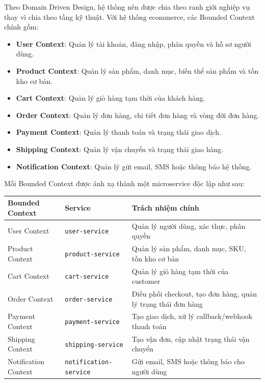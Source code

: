 Theo Domain Driven Design, hệ thống nên được chia theo ranh giới nghiệp vụ thay vì chia theo tầng kỹ thuật. Với hệ thống ecommerce, các Bounded Context chính gồm:

\begin{itemize}
  \item \textbf{User Context}: Quản lý tài khoản, đăng nhập, phân quyền và hồ sơ người dùng.
  \item \textbf{Product Context}: Quản lý sản phẩm, danh mục, biến thể sản phẩm và tồn kho cơ bản.
  \item \textbf{Cart Context}: Quản lý giỏ hàng tạm thời của khách hàng.
  \item \textbf{Order Context}: Quản lý đơn hàng, chi tiết đơn hàng và vòng đời đơn hàng.
  \item \textbf{Payment Context}: Quản lý thanh toán và trạng thái giao dịch.
  \item \textbf{Shipping Context}: Quản lý vận chuyển và trạng thái giao hàng.
  \item \textbf{Notification Context}: Quản lý gửi email, SMS hoặc thông báo hệ thống.
\end{itemize}

Mỗi Bounded Context được ánh xạ thành một microservice độc lập như sau:

\begin{longtable}{|p{4cm}|p{4cm}|p{6cm}|}
\hline
\textbf{Bounded Context} & \textbf{Service} & \textbf{Trách nhiệm chính} \\
\hline
User Context & \texttt{user-service} & Quản lý người dùng, xác thực, phân quyền \\
\hline
Product Context & \texttt{product-service} & Quản lý sản phẩm, danh mục, SKU, tồn kho cơ bản \\
\hline
Cart Context & \texttt{cart-service} & Quản lý giỏ hàng tạm thời của customer \\
\hline
Order Context & \texttt{order-service} & Điều phối checkout, tạo đơn hàng, quản lý trạng thái đơn hàng \\
\hline
Payment Context & \texttt{payment-service} & Tạo giao dịch, xử lý callback/webhook thanh toán \\
\hline
Shipping Context & \texttt{shipping-service} & Tạo vận đơn, cập nhật trạng thái vận chuyển \\
\hline
Notification Context & \texttt{notification-service} & Gửi email, SMS hoặc thông báo cho người dùng \\
\hline
\end{longtable}

